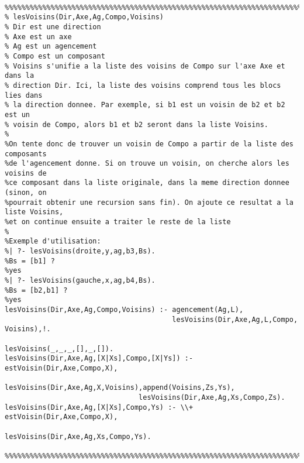 \documentclass[letterpaper,11pt]{letter}
\begin{document}
\begin{Verbatim}[fontseries=b]

%%%%%%%%%%%%%%%%%%%%%%%%%%%%%%%%%%%%%%%%%%%%%%%%%%%%%%%%%%%%%%%%%%%%%%%%%%%%%%%%
% lesVoisins(Dir,Axe,Ag,Compo,Voisins)
% Dir est une direction
% Axe est un axe
% Ag est un agencement
% Compo est un composant 
% Voisins s'unifie a la liste des voisins de Compo sur l'axe Axe et dans la 
% direction Dir. Ici, la liste des voisins comprend tous les blocs lies dans
% la direction donnee. Par exemple, si b1 est un voisin de b2 et b2 est un 
% voisin de Compo, alors b1 et b2 seront dans la liste Voisins.
%
%On tente donc de trouver un voisin de Compo a partir de la liste des composants
%de l'agencement donne. Si on trouve un voisin, on cherche alors les voisins de
%ce composant dans la liste originale, dans la meme direction donnee (sinon, on
%pourrait obtenir une recursion sans fin). On ajoute ce resultat a la liste Voisins,
%et on continue ensuite a traiter le reste de la liste 
%
%Exemple d'utilisation:
%| ?- lesVoisins(droite,y,ag,b3,Bs).
%Bs = [b1] ? 
%yes
%| ?- lesVoisins(gauche,x,ag,b4,Bs).
%Bs = [b2,b1] ? 
%yes
lesVoisins(Dir,Axe,Ag,Compo,Voisins) :- agencement(Ag,L),
                                        lesVoisins(Dir,Axe,Ag,L,Compo, Voisins),!.

lesVoisins(_,_,_,[],_,[]).
lesVoisins(Dir,Axe,Ag,[X|Xs],Compo,[X|Ys]) :- estVoisin(Dir,Axe,Compo,X),
                                lesVoisins(Dir,Axe,Ag,X,Voisins),append(Voisins,Zs,Ys),
                                lesVoisins(Dir,Axe,Ag,Xs,Compo,Zs).
lesVoisins(Dir,Axe,Ag,[X|Xs],Compo,Ys) :- \\+ estVoisin(Dir,Axe,Compo,X),
                                                lesVoisins(Dir,Axe,Ag,Xs,Compo,Ys).

%%%%%%%%%%%%%%%%%%%%%%%%%%%%%%%%%%%%%%%%%%%%%%%%%%%%%%%%%%%%%%%%%%%%%%%%%%%%%%%%
\end{Verbatim}
\end{document}
